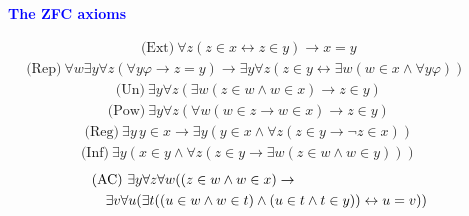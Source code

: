 \documentclass{slides}
\begin{document}
\begin{slide}

\begin{center}
\textcolor{blue}{\textbf{The ZFC axioms}}
\end{center}
\begin{eqnarray}
\mbox{(Ext)}\ \forall z ( z \in x \leftrightarrow z \in y ) \rightarrow x = y & &
\label{ax-ext}
\end{eqnarray}
\begin{eqnarray}
\mbox{(Rep)}\ \forall w \exists y \forall z ( \forall y \varphi \rightarrow z = y )
\rightarrow \exists y \forall z ( z \in y \leftrightarrow \exists w ( w \in x
\wedge \forall y \varphi ) ) & & \ \
\label{ax-rep}
\end{eqnarray}
\begin{eqnarray}
\mbox{(Un)}\ \exists y \forall z ( \exists w ( z \in w \wedge w \in x ) \rightarrow z
\in y)  & &
\label{ax-un}
\end{eqnarray}
\begin{eqnarray}
\mbox{(Pow)}\ \exists y \forall z ( \forall w ( w \in z \rightarrow w \in x )
\rightarrow z \in y)  & &
\label{ax-pow}
\end{eqnarray}
\begin{eqnarray}
\mbox{(Reg)}\ \exists y \,y \in x \rightarrow \exists y ( y \in x \wedge \forall z (
z \in y \rightarrow \lnot z \in x ) )   & &
\label{ax-reg}
\end{eqnarray}
\begin{eqnarray}
\mbox{(Inf)}\ \exists y ( x \in y \wedge \forall z ( z \in y \rightarrow \exists w ( z
\in w \wedge w \in y ) ) )  & &
\label{ax-inf}
\end{eqnarray}
\begin{eqnarray}
\lefteqn{\mbox{(AC)}\ \exists y \forall z \forall w ( ( z \in w
\wedge w \in x ) \rightarrow} \nonumber \\
& & \exists v \forall u ( \exists t ( ( u \in w \wedge w \in t )
 \wedge ( u \in t
\wedge t \in y ) ) \leftrightarrow u = v ))
\label{ax-ac}
\end{eqnarray}


\end{slide}
\end{document}
